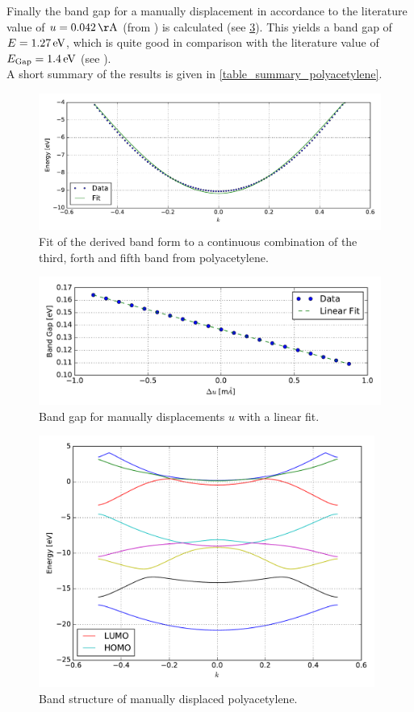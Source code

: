 Finally the band gap for a manually displacement in accordance to the literature value of $u = \unit[0.042]{\AA}$ (from \cite{PhysRevLett.42.1698, doi:10.1021/cr990357p}) is calculated (see \cref{image_manually_displaced_poly_bandstructure}). This yields a band gap of $E = \unit[1.27]{eV}$, which is quite good in comparison with the literature value of $E_\text{Gap} = \unit[1.4]{eV}$ (see \cite{PhysRevLett.42.1698}).\\
A short summary of the results is given in \cref{table_summary_polyacetylene}.\\
\begin{figure}
	\centering
	\includegraphics[width = 13cm]{Images/polyacetylene/bands/band_fit}
	\caption{Fit of the derived band form to a continuous combination of the third, forth and fifth band from polyacetylene.}
	\label{image_band_fit_t0}
\end{figure}
\begin{figure}
	\centering
	\includegraphics[width = 13cm]{Images/polyacetylene/bands/alpha}
	\caption{Band gap for manually displacements $u$ with a linear fit.}
	\label{image_alpha_fit}
\end{figure}
\begin{figure}
	\centering
	\includegraphics[width = 11cm]{Images/polyacetylene/bands/bandstructure_manually_displaced}
	\caption{Band structure of manually displaced polyacetylene.}
	\label{image_manually_displaced_poly_bandstructure}
\end{figure}
